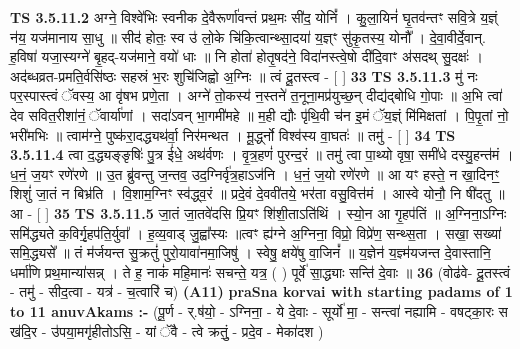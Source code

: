 \documentclass[17pt]{extarticle}
\begin{document}
                  \newline
                                \textbf{ TS 3.5.11.2} \newline
                  अग्ने॒ विश्वे॑भिः स्वनीक दे॒वैरूर्णा॑वन्तं प्रथ॒मः सी॑द॒ योनिं᳚ । कु॒ला॒यिनं॑ घृ॒तव॑न्तꣳ सवि॒त्रे य॒ज्ञ्ं न॑य॒ यज॑मानाय सा॒धु ॥ सीद॑ होतः॒ स्व उ॑ लो॒के चि॑कि॒त्वान्थ्सा॒दया॑ य॒ज्ञ्ꣳ सु॑कृ॒तस्य॒ योनौ᳚ । दे॒वा॒वीर्दे॒वान्. ह॒विषा॑ यजा॒स्यग्ने॑ बृ॒हद्-यज॑माने॒ वयो॑ धाः ॥ नि होता॑ होतृ॒षद॑ने॒ विदा॑नस्त्वे॒षो दी॑दि॒वाꣳ अ॑सदथ् सु॒दक्षः॑ । अद॑ब्धव्रत-प्रमति॒र्वसि॑ष्ठः सहस्रं भ॒रः शुचि॑जिह्वो अ॒ग्निः ॥ त्वं दू॒तस्त्व - [  ] \textbf{  33} \newline
                  \newline
                                \textbf{ TS 3.5.11.3} \newline
                  मु॑ नः पर॒स्पास्त्वं ॅवस्य॒ आ वृ॑षभ प्रणे॒ता । अग्ने॑ तो॒कस्य॑ न॒स्तने॑ त॒नूना॒मप्र॑युच्छ॒न् दीद्य॑द्बोधि गो॒पाः ॥ अ॒भि त्वा॑ देव सवित॒रीशा॑नं॒ ॅवार्या॑णां । सदा॑ऽवन् भा॒गमी॑महे ॥ म॒ही द्यौः पृ॑थि॒वी च॑न इ॒मं ॅय॒ज्ञ्ं मि॑मिक्षतां । पि॒पृ॒तां नो॒ भरी॑मभिः ॥ त्वाम॑ग्ने॒ पुष्क॑रा॒दद्ध्यथ॑र्वा॒ निर॑मन्थत । मू॒र्द्ध्नो विश्व॑स्य वा॒घतः॑ ॥ तमु॑ - [  ] \textbf{  34} \newline
                  \newline
                                \textbf{ TS 3.5.11.4} \newline
                  त्वा द॒द्ध्यङ्ङृषिः॑ पु॒त्र ई॑धे॒ अथ॑र्वणः । वृ॒त्र॒हणं॑ पुरन्द॒रं ॥ तमु॑ त्वा पा॒थ्यो वृषा॒ समी॑धे दस्यु॒हन्त॑मं । ध॒नं॒ ज॒यꣳ रणे॑रणे ॥ उ॒त ब्रु॑वन्तु ज॒न्तव॒ उद॒ग्निर्वृ॑त्र॒हाऽज॑नि । ध॒नं॒ ज॒यो रणे॑रणे ॥ आ यꣳ हस्ते॒ न खा॒दिनꣳ॒॒ शिशुं॑ जा॒तं न बिभ्र॑ति । वि॒शाम॒ग्निꣳ स्व॑द्ध्व॒रं ॥ प्रदे॒वं दे॒ववी॑तये॒ भर॑ता वसु॒वित्त॑मं । आस्वे योनौ॒ नि षी॑दतु ॥ आ - [  ] \textbf{  35} \newline
                  \newline
                                \textbf{ TS 3.5.11.5} \newline
                  जा॒तं जा॒तवे॑दसि प्रि॒यꣳ शि॑शी॒ताऽति॑थिं । स्यो॒न आ गृ॒हप॑तिं ॥ अ॒ग्निना॒ऽग्निः समि॑द्ध्यते क॒विर्गृ॒हप॑ति॒र्युवा᳚ । ह॒व्य॒वाड् जु॒ह्वा᳚स्यः ॥त्वꣳ ह्य॑ग्ने अ॒ग्निना॒ विप्रो॒ विप्रे॑ण॒ सन्थ्स॒ता । सखा॒ सख्या॑ समि॒द्ध्यसे᳚ ॥ तं म॑र्जयन्त सु॒क्रतुं॑ पुरो॒यावा॑नमा॒जिषु॑ । स्वेषु॒ क्षये॑षु वा॒जिनं᳚ ॥ य॒ज्ञेन॑ य॒ज्ञ्म॑यजन्त दे॒वास्तानि॒ धर्मा॑णि प्रथ॒मान्या॑सन्न् । ते ह॒ नाकं॑ महि॒मानः॑ सचन्ते॒ यत्र॒ ( ) पूर्वे॑ सा॒द्ध्याः सन्ति॑ दे॒वाः ॥ \textbf{  36} \newline
                  \newline
                      (वोढ॑वे- दू॒तस्त्वं - तमु॑ - सीद॒त्वा - यत्र॑ - च॒त्वारि॑ च)  \textbf{(A11)} \newline \newline
                \textbf{praSna korvai with starting padams of 1 to 11 anuvAkams :-} \newline
        (पू॒र्ण - र्.ष॑यो॒ - ऽग्निना॒ - ये दे॒वाः - सूर्यो॑ मा॒ - सन्त्वा॑ नह्यामि - वषट्का॒रः स ख॑दि॒र - उ॑पया॒मगृ॑हीतोऽसि॒ - यां ॅवै - त्वे क्रतुं॒ - प्रदे॒व - मेका॑दश ) \newline
\end{document}
